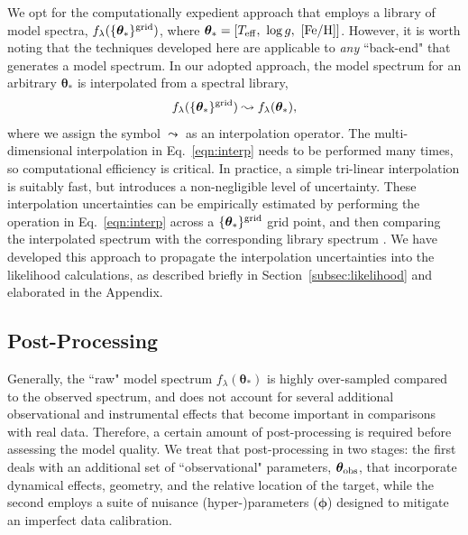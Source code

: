\documentclass[iop,floatfix,twocolappendix]{emulateapj}
\newcommand{\flam}{f_\lambda}
\newcommand{\vt}{ {\bm \theta}}
\newcommand{\vp}{ {\bm \phi}}
\begin{document}
We opt for the computationally expedient approach that employs a library of model spectra, 
$\flam(\{\vt_{\ast}\}^{\rm grid})$, where $\vt_{\ast} = [T_{\rm eff}, \,\, \log{g}, \,\, 
[{\rm Fe/H}]]$.  However, it is worth noting that the techniques developed here are applicable to 
{\it any} ``back-end" that generates a model spectrum.  In our adopted approach, the model spectrum 
for an arbitrary $\vt_{\ast}$ is interpolated from a spectral library,
\begin{equation} \label{eqn:interp} 
\flam(\{\vt_{\ast}\}^{\rm grid}) \leadsto \flam(\vt_{\ast}), 
\end{equation} 
where we assign the symbol $\leadsto$ as an interpolation operator.  The multi-dimensional 
interpolation in Eq.~\ref{eqn:interp} needs to be performed many times, so computational efficiency 
is critical.  In practice, a simple tri-linear interpolation is suitably fast, but introduces a 
non-negligible level of uncertainty.  These interpolation uncertainties can be empirically 
estimated by performing the operation in Eq.~\ref{eqn:interp} across a $\{\vt_{\ast}\}^{\rm grid}$ 
grid point, and then comparing the interpolated spectrum with the corresponding library spectrum 
\citep[see also][]{husser12}.  We have developed this approach to propagate the interpolation 
uncertainties into the likelihood calculations, as described briefly in 
Section~\ref{subsec:likelihood} and elaborated in the Appendix.


\subsection{Post-Processing} \label{subsec:postprocess}

Generally, the ``raw" model spectrum $\flam(\vt_{\ast})$ is highly over-sampled compared to the 
observed spectrum, and does not account for several additional observational and instrumental 
effects that become important in comparisons with real data.  Therefore, a certain amount of 
post-processing is required before assessing the model quality.  We treat that post-processing in 
two stages: the first deals with an additional set of ``observational" parameters, $\vt_{\rm obs}$, 
that incorporate dynamical effects, geometry, and the relative location of the target, while the 
second employs a suite of nuisance (hyper-)parameters ($\vp$) designed to mitigate an imperfect 
data calibration.
\end{document}
